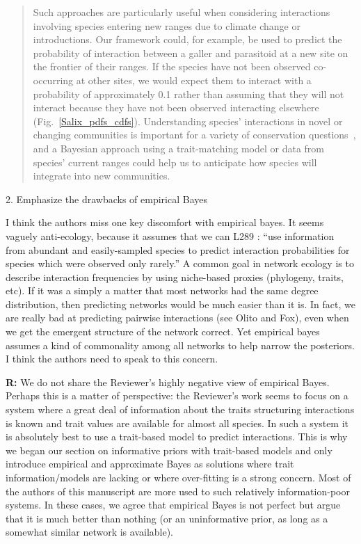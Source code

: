 \documentclass[12pt]{letter}
\newenvironment{refquote}{\bigskip \begin{it}}{\end{it}\smallskip}
\begin{document}
		\begin{quotation}

			Such approaches are particularly useful when considering interactions involving species entering new ranges due to climate change or introductions. Our framework could, for example, be used to predict the probability of interaction between a galler and parasitoid at a new site on the frontier of their ranges. If the species have not been observed co-occurring at other sites, we would expect them to interact with a probability of approximately 0.1 rather than assuming that they will not interact because they have not been observed interacting elsewhere (Fig.~\ref{Salix_pdfs_cdfs}). Understanding species' interactions in novel or changing communities is important for a variety of conservation questions~\citep{Bartomeus2013,Gravel2013}, and a Bayesian approach using a trait-matching model or data from species' current ranges could help us to anticipate how species will integrate into new communities. 

		\end{quotation}


	2. Emphasize the drawbacks of empirical Bayes


		\begin{refquote}

			I think the authors miss one key discomfort with empirical bayes. It seems vaguely anti-ecology, because it assumes that we can L289 : “use information from abundant and easily-sampled species to predict interaction probabilities for species which were observed only rarely.”  A common goal in network ecology is to describe interaction frequencies by using niche-based proxies (phylogeny, traits, etc). If it was a simply a matter that most networks had the same degree distribution, then predicting networks would be much easier than it is. In fact, we are really bad at predicting pairwise interactions (see Olito and Fox), even when we get the emergent structure of the network correct. Yet empirical bayes assumes a kind of commonality among all networks to help narrow the posteriors. I think the authors need to speak to this concern.

		\end{refquote}


		\textbf{R:} We do not share the Reviewer's highly negative view of empirical Bayes. Perhaps this is a matter of perspective: the Reviewer's work seems to focus on a system where a great deal of information about the traits structuring interactions is known and trait values are available for almost all species. In such a system it is absolutely best to use a trait-based model to predict interactions. This is why we began our section on informative priors with trait-based models and only introduce empirical and approximate Bayes as solutions where trait information/models are lacking or where over-fitting is a strong concern. Most of the authors of this manuscript are more used to such relatively information-poor systems. In these cases, we agree that empirical Bayes is not perfect but argue that it is much better than nothing (or an uninformative prior, as long as a somewhat similar network is available).
\end{document}
